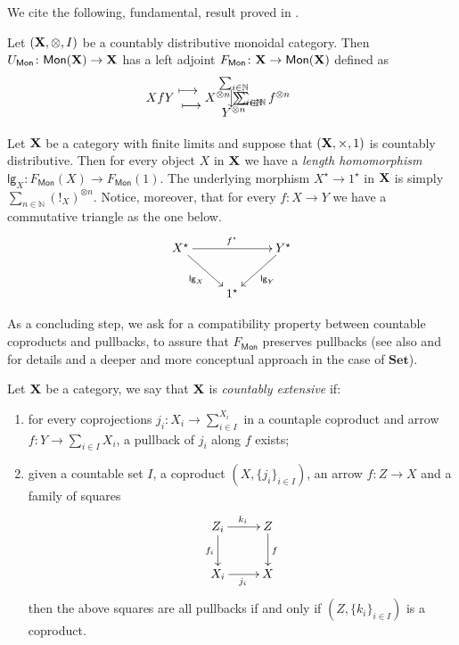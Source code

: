 \documentclass[runningheads,envcountsect]{llncs}
\newcommand\DownArrow{\rotatebox[origin=c]{-90}{$\longrightarrow$\,}}
\newcommand\functor[1][l]{\csname#1functor\endcsname}
\newcommand\rfunctor[3]{%
	\setbox0=\hbox{$#2$}%
	\ensurestackMath{\Centerstack[c]{#1\\\mathclap{\DownArrow}\mathrlap{\,\;#2}\\#3}}%
	\kern\wd0%
}
\newcommand\functormapsto{\mathrel{\ensurestackMath{\Centerstack[c]{\longmapsto\\ \\\longmapsto}}}}
\newcommand{\lgh}{\mathsf{lg}}
\newcommand{\Set}{\mathbf{Set}}
\def\X{\textbf {\textup{X}}}
\newcommand{\catname}[1]{\textbf{\textup{#1}}}
\newcommand{\mono}[1]{\mathsf{Mon}(\catname{#1})}
\newcommand{\mo}[1]{{#1}_\mathsf{Mon}}
\begin{document}
We cite the following, fundamental, result proved in \cite{lack2010note}.

\begin{theorem}
	Let $(\X, \otimes, I )$ be a countably distributive monoidal category. Then $\mo{U}\colon \mono{X}\to \X$ has a left adjoint  $\mo{F}\colon \X\to \mono{X}$ defined as
\[	\functor[l]{X}{f}{Y}
\functormapsto
\rfunctor{\sum_{i\in \mathbb{N}} X^{\otimes n}}{\sum_{i\in \mathbb{N}} f^{\otimes n}}{\sum_{i\in \mathbb{N}} Y^{\otimes n}}\]
\end{theorem}


\begin{remark}\label{rem:lg} Let $\X$ be a category with finite limits and suppose that $(\X, \times, 1)$ is countably distributive.  Then for every object $X$ in $\X$ we have a \emph{length homomorphism} $\lgh_X\colon \mo{F}(X)\to \mo{F}(1)$. The underlying morphism $X^\star \to 1^\star$ in $\X$ is simply $\sum_{n\in \mathbb{N}} (!_X)^{\otimes n}$.  Notice, moreover, that for every $f\colon X\to Y$ we have a commutative triangle as the one below.
	\[\xymatrix{X^\star \ar[rr]^{f^\star} \ar[dr]_{\lgh_X}&& Y^\star  \ar[dl]^{\lgh_Y}\\ & 1^\star }\]
\end{remark}

As a concluding step, we ask for a compatibility property between countable coproducts and pullbacks, to assure that $\mo{F}$ preserves pullbacks (see also \cite[Sec. 3]{carboni1995connected}  and \cite[Ch.4]{leinster2004higher} for details and a deeper and more conceptual approach in the case of $\Set$).

\begin{definition}
	Let $\X$ be a category, we say that $\X$ is \emph{countably extensive} if:
	\begin{enumerate}
		\item  for every coprojections $j_i \colon X_i\to \sum_{i\in I}^{X_i} $ in a countaple coproduct and arrow $f\colon Y\to \sum_{i\in I} X_i$, a pullback of $j_i$ along $f$ exists; 
		\item given a countable set $I$, a coproduct $(X, \{j_i\}_{i\in I})$, an arrow $f\colon Z\to X$ and a family of squares
		\[\xymatrix{Z_i \ar[r]^{k_i} \ar[d]_{f_i} & Z\ar[d]^{f} \\ X_i \ar[r]_{j_i} & X}\]
		then the above squares are all pullbacks if and only if $(Z, \{k_i\}_{i\in I})$ is a coproduct.
	\end{enumerate} 
\end{definition}
\end{document}
